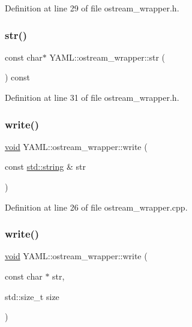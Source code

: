 Definition at line 29 of file ostream\+\_\+wrapper.\+h.

\mbox{\label{class_y_a_m_l_1_1ostream__wrapper_a582c854b4d9abc7344b17f2fa91575c2}} 
\subsubsection{\texorpdfstring{str()}{str()}}
{\footnotesize\ttfamily const char$\ast$ Y\+A\+M\+L\+::ostream\+\_\+wrapper\+::str (\begin{DoxyParamCaption}{ }\end{DoxyParamCaption}) const\hspace{0.3cm}{\ttfamily [inline]}}



Definition at line 31 of file ostream\+\_\+wrapper.\+h.

\mbox{\label{class_y_a_m_l_1_1ostream__wrapper_a9530c6507de27dce5dde5324b64a7b81}} 
\subsubsection{\texorpdfstring{write()}{write()}\hspace{0.1cm}{\footnotesize\ttfamily [1/2]}}
{\footnotesize\ttfamily \mbox{\hyperlink{glad_8h_a950fc91edb4504f62f1c577bf4727c29}{void}} Y\+A\+M\+L\+::ostream\+\_\+wrapper\+::write (\begin{DoxyParamCaption}\item[{const \mbox{\hyperlink{glad_8h_ac83513893df92266f79a515488701770}{std\+::string}} \&}]{str }\end{DoxyParamCaption})}



Definition at line 26 of file ostream\+\_\+wrapper.\+cpp.

\mbox{\label{class_y_a_m_l_1_1ostream__wrapper_aeea427708949f62b538770d72d1a2a57}} 
\subsubsection{\texorpdfstring{write()}{write()}\hspace{0.1cm}{\footnotesize\ttfamily [2/2]}}
{\footnotesize\ttfamily \mbox{\hyperlink{glad_8h_a950fc91edb4504f62f1c577bf4727c29}{void}} Y\+A\+M\+L\+::ostream\+\_\+wrapper\+::write (\begin{DoxyParamCaption}\item[{const char $\ast$}]{str,  }\item[{std\+::size\+\_\+t}]{size }\end{DoxyParamCaption})}



